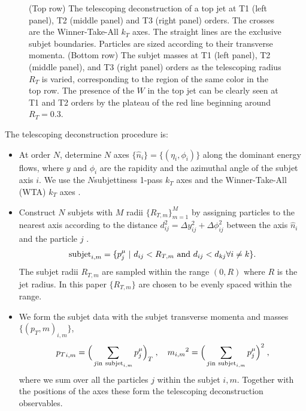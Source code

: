 \documentclass[notoc]{JHEP3}
\def\in{{\rm in}}
\begin{document}
\begin{figure}[t]
\caption{\label{fig:tjet}(Top row) The telescoping deconstruction of a top jet at T1 (left panel), T2 (middle panel) and T3 (right panel) orders. The crosses are the Winner-Take-All $k_T$ axes. The straight lines are the exclusive subjet boundaries. Particles are sized according to their transverse momenta. (Bottom row) The subjet masses at T1 (left panel), T2 (middle panel), and T3 (right panel) orders as the telescoping radius $R_T$ is varied, corresponding to the region of the same color in the top row. The presence of the $W$ in the top jet can be clearly seen at T1 and T2 orders by the plateau of the red line beginning around $R_T=0.3$.}
\end{figure}

The telescoping deconstruction procedure is: %
\begin{itemize}
        \item At order $N$, determine $N$ axes $\{\hat n_i\}=\{(\eta_i,\phi_i)\}$ along the dominant energy flows, where $y$ and $\phi_i$ are the rapidity and the azimuthal angle of the subjet axis $i$. We use the $N$subjettiness 1-pass $k_T$ axes and the Winner-Take-All (WTA) $k_T$ axes \cite{Thaler:2010tr}.
        \item Construct $N$ subjets with $M$ radii $\{R_{T,m}\}^M_{m=1}$ by assigning particles to the nearest axis according to the distance $d^2_{ij} = \Delta y_{ij}^2+\Delta \phi_{ij}^2$ between the axis $\hat n_i$ and the particle $j$ \cite{Stewart:2010tn,Chien:2013kca,Stewart:2015waa,Thaler:2015xaa}.
            \begin{equation}
                {\rm subjet}_{i,m} = \{p^\mu_j~|~d_{ij}<R_{T,m}~{\rm and}~d_{ij}<d_{kj} \forall i\neq k\}.
            \end{equation}
            The subjet radii ${R_{T,m}}$ are sampled within the range $(0,R)$ where $R$ is the jet radius. In this paper $\{R_{T,m}\}$ are chosen to be evenly spaced within the range.
        \item We form the subjet data with the subjet transverse momenta and masses $\{(p_T,m)_{i,m}\}$,
            \begin{equation}
                {p_T}_{i,m}=\Big(\sum_{j\in~{\rm subjet}_{i,m}}p^\mu_j\Big)_T\;,~~~{m_{i,m}}^2=\Big(\sum_{j\in~{\rm subjet}_{i,m}}p^\mu_j\Big)^2\;,
            \end{equation}
            where we sum over all the particles $j$ within the subjet $i,m$. Together with the positions of the axes these form the telescoping deconstruction observables.
    \end{itemize}
\end{document}
